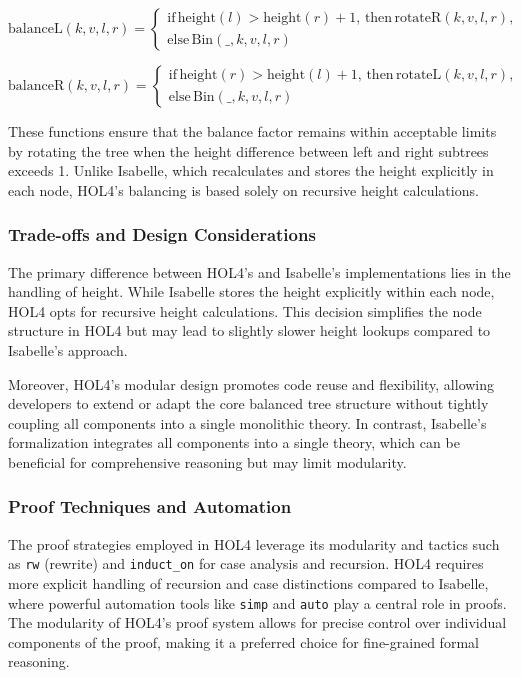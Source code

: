 \[
\text{balanceL}(k, v, l, r) = 
\begin{cases}
	\text{if} \, \text{height}(l) > \text{height}(r) + 1, \, \text{then} \, \text{rotateR}(k, v, l, r), \\
	\text{else} \, \text{Bin}(\_, k, v, l, r)
\end{cases}
\]

\[
\text{balanceR}(k, v, l, r) = 
\begin{cases}
	\text{if} \, \text{height}(r) > \text{height}(l) + 1, \, \text{then} \, \text{rotateL}(k, v, l, r), \\
	\text{else} \, \text{Bin}(\_, k, v, l, r)
\end{cases}
\]


These functions ensure that the balance factor remains within acceptable limits by rotating the tree when the height difference between left and right subtrees exceeds 1. Unlike Isabelle, which recalculates and stores the height explicitly in each node, HOL4’s balancing is based solely on recursive height calculations.

\subsubsection{Trade-offs and Design Considerations}
The primary difference between HOL4’s and Isabelle’s implementations lies in the handling of height. While Isabelle stores the height explicitly within each node, HOL4 opts for recursive height calculations. This decision simplifies the node structure in HOL4 but may lead to slightly slower height lookups compared to Isabelle’s approach.

Moreover, HOL4's modular design promotes code reuse and flexibility, allowing developers to extend or adapt the core balanced tree structure without tightly coupling all components into a single monolithic theory. In contrast, Isabelle's formalization integrates all components into a single theory, which can be beneficial for comprehensive reasoning but may limit modularity.

\subsubsection{Proof Techniques and Automation}
The proof strategies employed in HOL4 leverage its modularity and tactics such as \texttt{rw} (rewrite) and \texttt{induct\_on} for case analysis and recursion. HOL4 requires more explicit handling of recursion and case distinctions compared to Isabelle, where powerful automation tools like \texttt{simp} and \texttt{auto} play a central role in proofs. The modularity of HOL4’s proof system allows for precise control over individual components of the proof, making it a preferred choice for fine-grained formal reasoning.

